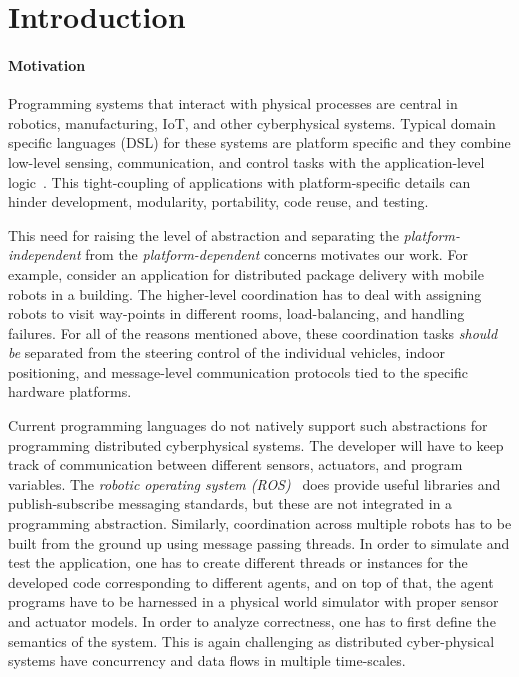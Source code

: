 \section{Introduction}
\label{sec:intro}

\paragraph{Motivation}
Programming systems that interact with physical processes are central in  robotics, manufacturing, IoT, and other cyberphysical systems. Typical domain specific languages (DSL) for these systems are platform specific and they combine  low-level sensing, communication, and control tasks with the application-level logic~\cite{nordmann2014robotics}. This  tight-coupling of applications with platform-specific details can hinder development, modularity, portability, code reuse, and testing. 

This need for raising the level of abstraction and separating the \emph{platform-independent} from the \emph{platform-dependent} concerns motivates our work. For example, consider an application for distributed package delivery with mobile robots in a building. The higher-level coordination has to deal with assigning robots to visit way-points in different rooms, load-balancing, and handling failures.  For all of the reasons mentioned above, these coordination tasks {\em should be\/} separated from the  steering control of the individual vehicles, indoor positioning, and message-level communication protocols tied to the specific hardware platforms. 

Current programming languages do not natively support such abstractions for programming distributed cyberphysical systems.  The developer will have to keep track of communication between different sensors, actuators, and program variables. The {\em robotic operating system (ROS)}~\cite{rosbridge_suite,ros} does provide useful libraries and  publish-subscribe messaging standards, but these are not integrated in a programming abstraction. Similarly, coordination across multiple robots has to be built from the ground up using message passing threads. In order to simulate and test the application, one has to create different threads or instances for the developed code corresponding to different agents, and on top of that, the agent programs have to be harnessed in a physical world simulator with proper sensor and actuator models. In order to analyze correctness, one has to first define the semantics of the system. This  is again challenging  as  distributed cyber-physical systems have concurrency and data flows in multiple time-scales. 

